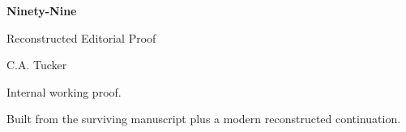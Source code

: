 \documentclass[11pt,openright]{book}
\begin{document}
\frontmatter
\thispagestyle{empty}
\vspace*{\fill}
\begin{center}
{\Huge \textbf{Ninety-Nine}\par}
\vspace{1em}
{\Large Reconstructed Editorial Proof\par}
\vspace{2em}
{\Large C.A. Tucker\par}
\end{center}
\vspace*{\fill}
\clearpage

\thispagestyle{empty}
\vspace*{\fill}
\begin{center}
Internal working proof.

\vspace{1em}
Built from the surviving manuscript plus a modern reconstructed
continuation.
\end{center}
\vspace*{\fill}
\clearpage

\tableofcontents
\clearpage

\mainmatter

\end{document}
